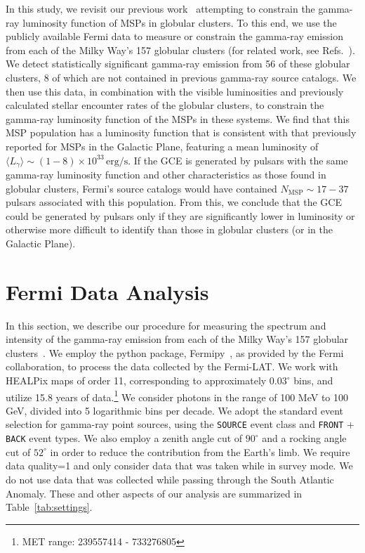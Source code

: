 \documentclass[a4paper,11pt]{article}
\begin{document}
In this study, we revisit our previous work~\cite{Hooper:2016rap} attempting to constrain the gamma-ray luminosity function of MSPs in globular clusters. To this end, we use the publicly available Fermi data to measure or constrain the gamma-ray emission from each of the Milky Way's 157 globular clusters (for related work, see Refs.~\cite{Hou:2024wpr,Ballet:2023qzs,Zhang:2023gwr,Evans:2022zno,Zhang:2022jlx,Yuan:2022egs,deMenezes:2018ilq,Cholis:2014noa,Fermi-LAT:2010gpc}). We detect statistically significant gamma-ray emission from 56 of these globular clusters, 8 of which are not contained in previous
gamma-ray source catalogs. We then use this data, in combination with the visible luminosities and previously calculated stellar encounter rates of the globular clusters, to constrain the gamma-ray luminosity function of the MSPs in these systems. We find that this MSP population has a luminosity function that is consistent with that previously reported for MSPs in the Galactic Plane, featuring a mean luminosity of $\langle L_{\gamma}\rangle \sim (1-8) \times 10^{33} \, \textrm{erg/s}$. If the GCE is generated by pulsars with the same gamma-ray luminosity function and other characteristics as those found in globular clusters, Fermi's source catalogs would have contained $N_\textrm{MSP} \sim 17-37$ pulsars associated with this population. From this, we conclude that the GCE could be generated by pulsars only if they are significantly lower in luminosity or otherwise more difficult to identify than those in globular clusters (or in the Galactic Plane). 

  


\section{Fermi Data Analysis}
\label{sec:fermi-data-analysis}


In this section, we describe our procedure for measuring the spectrum and intensity of the gamma-ray emission from each of the Milky Way's 157 globular clusters~\cite{harris2010newcatalogglobularclusters}.
We employ the python package, Fermipy~\cite{wood2017fermipyopensourcepythonpackage}, as provided by the Fermi collaboration, to process the data collected by the Fermi-LAT. 
We work with HEALPix maps of order 11, corresponding to approximately $0.03^{\circ}$ bins, and utilize 15.8 years of data.\footnote{MET range:  239557414 - 733276805} We consider photons in the range of 100 MeV to 100 GeV, divided into 5 logarithmic bins per decade. We adopt the standard event selection for gamma-ray point sources, using the \verb|SOURCE| event class and \verb|FRONT| + \verb|BACK| event types. We also employ a zenith angle cut of $90^{\circ}$ and a rocking angle cut of $52^{\circ}$ in order to reduce the contribution from the Earth's limb. We require data quality=1 and only consider data that was taken while in survey mode. We do not use data that was collected while passing through the South Atlantic Anomaly. These and other aspects of our analysis are summarized in Table~\ref{tab:settings}.
\end{document}

